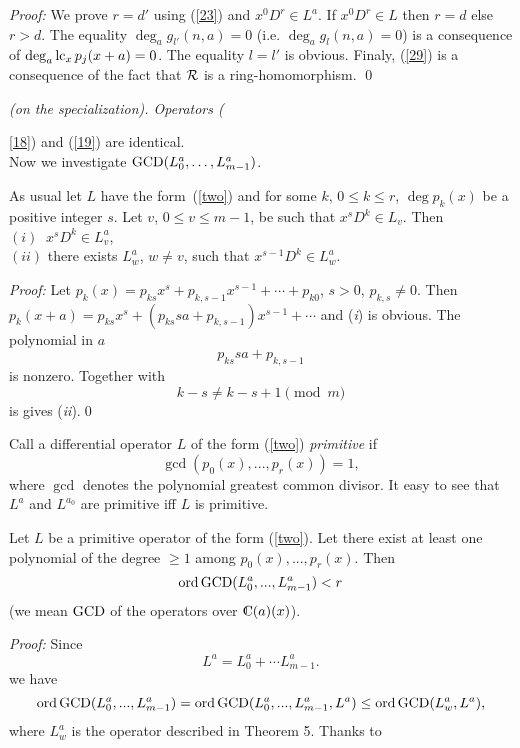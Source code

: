 {\em Proof:\/} We prove $r=d'$ using (\ref{23}) and
$x^0D^r\in L^a$.
If $x^0D^r\in L$ then $r=d$ else $r>d$.
The equality $\deg_a g_{l'}(n,a)=0$ (i.e. $\deg_a g_l(n,a)=0$) is a
consequence of $\deg_a \mathop{\rm lc}_x p_j(x+a)=0$. The equality $l=l'$ is
obvious. Finaly, (\ref{29}) is a consequence of the fact that
${\cal R}$ is a ring-homomorphism. \qed
\\
 {\em (on the specialization).
Operators ({\ref{18}) and ({\ref{19}) are identical}.
\\

Now we investigate $\mathop{\rm GCD} (L_0^a,\ldots, L_{m-1}^a)$.

\begin{Theorem}
\label {vw}
As usual let $L$ have the form~(\ref{two}) and for some $k$,
$0\le k\le r$, $\deg p_k(x)$ be a positive integer $s$.
Let $v$, $0\le v\le m-1$, be such that $x^sD^k \in L_v$. Then\\
$(i)\;\; x^sD^k \in L_v^a$,\\
$(ii)$ there exists $L_w^a$, $w\ne v$, such that $x^{s-1}D^k \in L_w^a$.

\end{Theorem}
{\em Proof:\/}
Let $p_k(x)=p_{ks}x^s+p_{k,s-1}x^{s-1}+\cdots +p_{k0}$, $s>0$,
$p_{k,s}\ne 0$.  Then
$p_k(x+a)=p_{ks}x^s+(p_{ks}sa+p_{k,s-1})x^{s-1}+\cdots$ and
({\em i}) is obvious. The polynomial in $a$
$$p_{ks}sa+p_{k,s-1} $$
is nonzero. Together with
$$ k-s \ne k-s+1 \pmod m $$ is gives ({\em ii}).\qed

Call a differential operator $L$ of the form (\ref{two}) {\em
primitive} if
\begin{equation}
\label{gcd}
\gcd (p_0(x),...,p_r(x))=1,
\end{equation}
where $\gcd $
denotes the polynomial greatest common divisor. It easy to see that
$L^a$ and $L^{a_0}$ are primitive iff $L$ is primitive.


\begin{Theorem}
\label{ncc}
Let $L$ be a primitive operator of the form (\ref{two}).
Let there exist at least one polynomial of the degree $\ge 1$
among $p_0(x),...,p_r(x)$.
Then
$$
\mathop{\rm ord} \mathop{\rm GCD}(L_0^a,...,L_{m-1}^a)<r
$$
(we mean $\mathop{\rm GCD}$ of the operators over
{\rm $\complex (a)(x)$}).
\end{Theorem}
{\em Proof:\/}
Since
\begin{equation}
\label{suma}
L^a=L_0^a+\cdots L_{m-1}^a.
\end{equation}
we have
$$\mathop{\rm ord} \mathop{\rm GCD} (L_0^a,...,L_{m-1}^a)=
\mathop{\rm ord} \mathop{\rm GCD} (L_0^a,...,L_{m-1}^a,L^a) \leq
\mathop{\rm ord} \mathop{\rm GCD} (L_w^a,L^a),$$
where $L_w^a$ is the operator described in Theorem 5. Thanks to

}}
